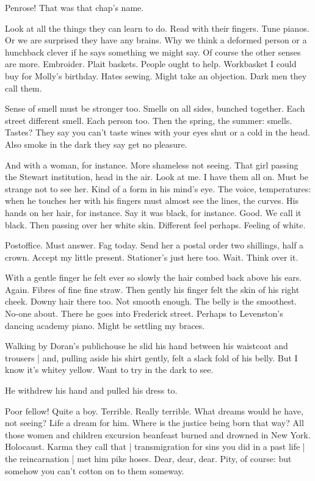 Penrose!
That was that chap's name.

Look at all the things they can learn to do.
Read with their fingers.
Tune pianos.
Or we are surprised they have any brains.
Why we think a deformed person or a hunchback clever if he says something we might say.
Of course the other senses are more.
Embroider.
Plait baskets.
People ought to help.
Workbasket I could buy for Molly's birthday.
Hates sewing.
Might take an objection.
Dark men they call them.

Sense of smell must be stronger too.
Smells on all sides, bunched together.
Each street different smell.
Each person too.
Then the spring, the summer:
smells.
Tastes?
They say you can't taste wines with your eyes shut or a cold in the head.
Also smoke in the dark they say get no pleasure.

And with a woman, for instance.
More shameless not seeing.
That girl passing the Stewart institution,
head in the air.
Look at me.
I have them all on.
Must be strange not to see her.
Kind of a form in his mind's eye.
The voice, temperatures:
when he touches her with his fingers
must almost see the lines, the curves.
His hands on her hair, for instance.
Say it was black, for instance.
Good.
We call it black.
Then passing over her white skin.
Different feel perhaps.
Feeling of white.

Postoffice.
Must answer.
Fag today.
Send her a postal order
two shillings, half a crown.
Accept my little present.
Stationer's just here too.
Wait.
Think over it.

With a gentle finger
he felt ever so slowly the hair combed back above his ears.
Again.
Fibres of fine fine straw.
Then gently his finger felt
the skin of his right cheek.
Downy hair there too.
Not smooth enough.
The belly is the smoothest.
No-one about.
There he goes into Frederick street.
Perhaps to Levenston's dancing academy piano.
Might be settling my braces.

Walking by Doran's publichouse
he slid his hand between his waistcoat and trousers |
and, pulling aside his shirt gently,
felt a slack fold of his belly.
But I know it's whitey yellow.
Want to try in the dark to see.

He withdrew his hand and pulled his dress to.

Poor fellow!
Quite a boy.
Terrible.
Really terrible.
What dreams would he have,
not seeing?
Life a dream for him.
Where is the justice being born that way?
All those women and children excursion beanfeast burned and drowned in New York.
Holocaust.
Karma they call that |
transmigration for sins you did in a past life |
the reincarnation |
met him pike hoses.
Dear, dear, dear.
Pity, of course:
but somehow you can't cotton on to them someway.

